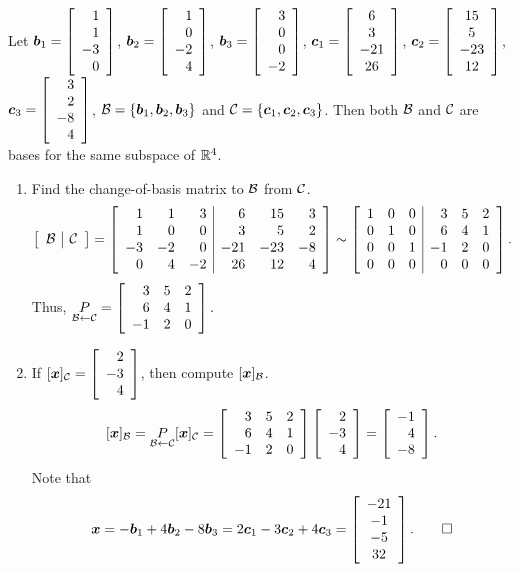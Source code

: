 \begin{Exam}  Let $\bb b_1 = \vr{1\\1\\-3\\0}$, $\bb b_2 = \vr{1\\0\\-2\\4}$, $\bb b_3 = \vr{3\\0\\0\\-2}$,  $\bb c_1 = \mtx{c}{6\\3\\-21\\26}$, $\bb c_2 = \mtx{c}{15\\5\\-23\\12}$, $\bb c_3 = \vr{3\\2\\-8\\4}$, $\B = \{\bb b_1, \bb b_2, \bb b_3\}$ and $\c = \{\bb c_1, \bb c_2, \bb c_3\}$. Then both $\B$ and $\c$ are bases for the same subspace of $\R^4$. \\
\begin{enumerate}
\item Find the change-of-basis matrix to $\B$ from $\c$.\\
\[
\mtx{c|c}{\B & \c} = \mtx{rrr|rrr}{1&1&3&6&15&3\\1&0&0&3&5&2\\-3&-2&0&-21&-23&-8\\0&4&-2&26&12&4} \sim  \mtx{rrr|rrr}{1&0&0&3&5&2\\0&1&0&6&4&1\\0&0&1&-1&2&0\\0&0&0&0&0&0}.\] Thus, $\underset{\B\leftarrow\c}{P} = \mtx{rrr}{3&5&2\\6&4&1\\-1&2&0}.$\\ 

\item If $[\bb x]_\c = \vr{2\\-3\\4}$, then compute $[\bb x]_\B$.\\

\[[\bb x]_\B = \underset{\B\leftarrow \c}{P}[\bb x]_\c = \mtx{rrr}{3&5&2\\6&4&1\\-1&2&0}\vr{2\\-3\\4} = \vr{-1\\4\\-8}.\]Note that \[\bb x = -\bb b_1+ 4\bb b_2- 8\bb b_3 = 2\bb c_1 - 3\bb c_2+4\bb c_3= \mtx{c}{-21\\-1\\-5\\32}.\qedhere\]
\end{enumerate}
\end{Exam}\vs

